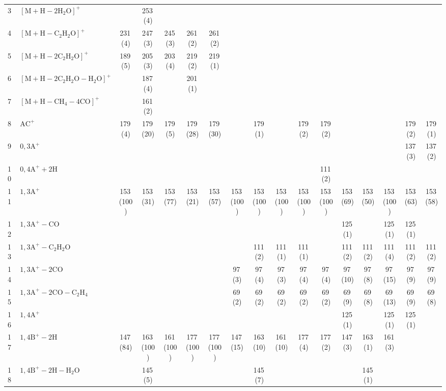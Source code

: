 \documentclass[]{article}
\begin{document}
\begin{table}
{\begin{tabular}{ll|ccccc|ccccc|ccccc}
  3 & $\mathrm{[M{+}H{-}2H_{2}O]^+}$ &  & 253\,(4) &  &  &  &  &  &  &  &  &  &  &  &  &  \\ 
  4 & $\mathrm{[M{+}H{-}C_{2}H_{2}O]^+}$ & 231\,(4) & 247\,(3) & 245\,(3) & 261\,(2) & 261\,(2) &  &  &  &  &  &  &  &  &  &  \\ 
  5 & $\mathrm{[M{+}H{-}2C_{2}H_{2}O]^+}$ & 189\,(5) & 205\,(3) & 203\,(4) & 219\,(2) & 219\,(1) &  &  &  &  &  &  &  &  &  &  \\ 
  6 & $\mathrm{[M{+}H{-}2C_{2}H_{2}O{-}H_{2}O]^+}$ &  & 187\,(4) &  & 201\,(1) &  &  &  &  &  &  &  &  &  &  &  \\ 
  7 & $\mathrm{[M{+}H{-}CH_{4}{-}4CO]^+}$ &  & 161\,(2) &  &  &  &  &  &  &  &  &  &  &  &  &  \\ 
  8 & $\mathrm{AC^+}$ & 179\,(4) & 179\,(20) & 179\,(5) & 179\,(28) & 179\,(30) &  & 179\,(1) &  & 179\,(2) & 179\,(2) &  &  &  & 179\,(2) & 179\,(1) \\ 
  9 & $\mathrm{0{,}3A^+}$ &  &  &  &  &  &  &  &  &  &  &  &  &  & 137\,(3) & 137\,(2) \\ 
  10 & $\mathrm{0{,}4A^+{+}2H}$ &  &  &  &  &  &  &  &  &  & 111\,(2) &  &  &  &  &  \\ 
  11 & $\mathrm{1{,}3A^+}$ & 153\,(100) & 153\,(31) & 153\,(77) & 153\,(21) & 153\,(57) & 153\,(100) & 153\,(100) & 153\,(100) & 153\,(100) & 153\,(100) & 153\,(69) & 153\,(50) & 153\,(100) & 153\,(63) & 153\,(58) \\ 
  12 & $\mathrm{1{,}3A^+{-}CO}$ &  &  &  &  &  &  &  &  &  &  & 125\,(1) &  & 125\,(1) & 125\,(1) &  \\ 
  13 & $\mathrm{1{,}3A^+{-}C_{2}H_{2}O}$ &  &  &  &  &  &  & 111\,(2) & 111\,(1) & 111\,(1) &  & 111\,(2) & 111\,(2) & 111\,(4) & 111\,(2) & 111\,(2) \\ 
  14 & $\mathrm{1{,}3A^+{-}2CO}$ &  &  &  &  &  & 97\,(3) & 97\,(4) & 97\,(3) & 97\,(4) & 97\,(4) & 97\,(10) & 97\,(8) & 97\,(15) & 97\,(9) & 97\,(9) \\ 
  15 & $\mathrm{1{,}3A^+{-}2CO{-}C_{2}H_{4}}$ &  &  &  &  &  & 69\,(2) & 69\,(2) & 69\,(2) & 69\,(2) & 69\,(2) & 69\,(9) & 69\,(8) & 69\,(13) & 69\,(9) & 69\,(8) \\ 
  16 & $\mathrm{1{,}4A^+}$ &  &  &  &  &  &  &  &  &  &  & 125\,(1) &  & 125\,(1) & 125\,(1) &  \\ 
  17 & $\mathrm{1{,}4B^+{-}2H}$ & 147\,(84) & 163\,(100) & 161\,(100) & 177\,(100) & 177\,(100) & 147\,(15) & 163\,(10) & 161\,(10) & 177\,(4) & 177\,(2) & 147\,(3) & 163\,(1) & 161\,(3) &  &  \\ 
  18 & $\mathrm{1{,}4B^+{-}2H{-}H_{2}O}$ &  & 145\,(5) &  &  &  &  & 145\,(7) &  &  &  &  & 145\,(1) &  &  &  \\ 

\end{tabular}}
\end{table}
\end{document}
